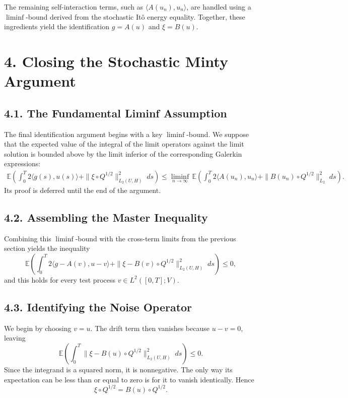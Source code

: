 \documentclass[11pt]{article}
\theoremstyle{definition}
\theoremstyle{remark}
\begin{document}
The remaining self-interaction terms, such as \(\langle A(u_n),u_n\rangle\), are handled using a \(\liminf\)-bound derived from the stochastic It\^o energy equality. Together, these ingredients yield the identification \(g=A(u)\) and \(\xi=B(u)\).

\section*{4. Closing the Stochastic Minty Argument}

\subsection*{4.1. The Fundamental Liminf Assumption}
The final identification argument begins with a key \(\liminf\)-bound. We suppose that the expected value of the integral of the limit operators against the limit solution is bounded above by the limit inferior of the corresponding Galerkin expressions:
\[
\begin{aligned}
\mathbb E\left(
\int_0^T
2\langle g(s),u(s)\rangle
+
\|\xi\circ Q^{1/2}\|_{L_2(U,H)}^2
\;ds
\right)
\le
\liminf_{n\to\infty}\,
\mathbb E\left(
\int_0^T
2\langle A(u_n),u_n\rangle
+
\|B(u_n)\circ Q^{1/2}\|_{L_2}^2
\;ds
\right).
\end{aligned}
\]
Its proof is deferred until the end of the argument.

\subsection*{4.2. Assembling the Master Inequality}
Combining this \(\liminf\)-bound with the cross-term limits from the previous section yields the inequality
\[
\mathbb E\left(
\int_0^T
2\langle g-A(v),u-v\rangle
+
\|\xi-B(v)\circ Q^{1/2}\|_{L_2(U,H)}^2
\;ds
\right)
\le 0,
\]
and this holds for every test process \(v\in L^2([0,T];V)\).

\subsection*{4.3. Identifying the Noise Operator}
We begin by choosing \(v=u\). The drift term then vanishes because \(u-v=0\), leaving
\[
\mathbb E\left(
\int_0^T
\|\xi-B(u)\circ Q^{1/2}\|_{L_2(U,H)}^2
\;ds
\right)
\le 0.
\]
Since the integrand is a squared norm, it is nonnegative. The only way its expectation can be less than or equal to zero is for it to vanish identically. Hence
\[
\xi\circ Q^{1/2}=B(u)\circ Q^{1/2}.
\]
\end{document}
